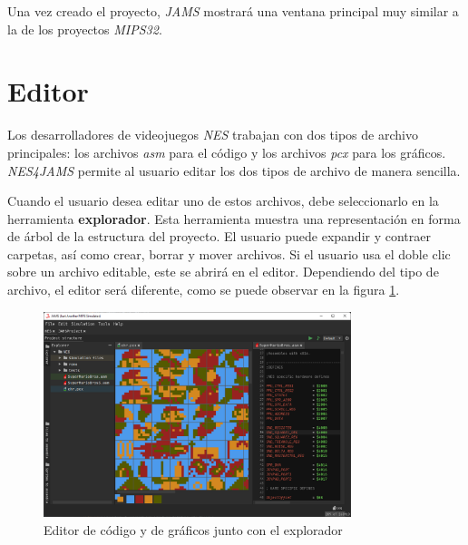 Una vez creado el proyecto, \textit{JAMS} mostrará una ventana
principal muy similar a la de los proyectos \textit{MIPS32}. 


\section{Editor}\label{sec:editor}

Los desarrolladores de videojuegos  \textit{NES} trabajan con
dos tipos de archivo principales: los archivos \textit{asm}
para el código y los archivos \textit{pcx} para los gráficos.
\textit{NES4JAMS} permite al usuario editar los dos tipos de archivo
de manera sencilla.

Cuando el usuario desea editar uno de estos archivos,
debe seleccionarlo en la herramienta \textbf{explorador}.
Esta herramienta muestra una representación en forma de árbol
de la estructura del proyecto.
El usuario puede expandir y contraer carpetas, así como crear,
borrar y mover archivos.
Si el usuario usa el doble clic sobre un archivo editable, este se abrirá
en el editor.
Dependiendo del tipo de archivo, el editor será diferente,
como se puede observar en la figura \ref{fig:nes-editor}.

\begin{figure}[h]
    \centering
    \includegraphics[width=0.8\textwidth]{images/nes/nes-editor}
    \caption{Editor de código y de gráficos junto con el explorador}
    \label{fig:nes-editor}
\end{figure}


